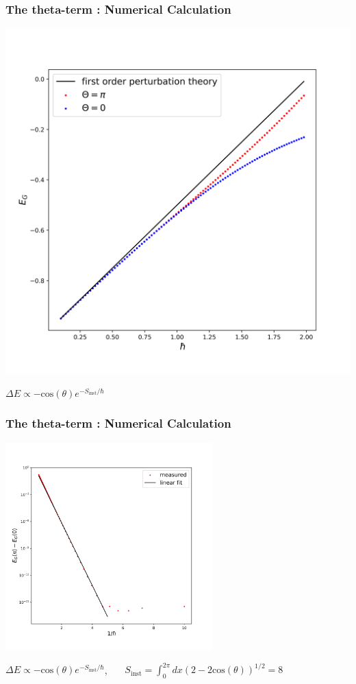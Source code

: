 \documentclass[10pt]{beamer}
\begin{document}
\begin{frame}
    \frametitle{The theta-term : Numerical Calculation}
        \includegraphics[width=0.6 \textwidth]{E_G.png}

        $\Delta E \propto -\text{cos}(\theta)e^{-S_{\text{inst}}/\hbar}$
\end{frame}

\begin{frame}
    \frametitle{The theta-term : Numerical Calculation}

       \includegraphics[width=0.6\textwidth]{E_G_diff.png}

     $\Delta E \propto -\text{cos}(\theta)e^{-S_{\text{inst}}/\hbar}$, \ \ \ 
     $S_{\text{inst}} = \int_0^{2\pi} dx \left(2-2\text{cos}(\theta)\right)^{1/2}=8$
    \end{frame}
\end{document}

